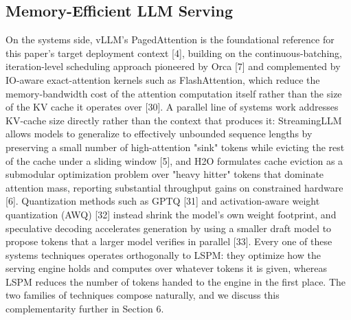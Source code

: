 \documentclass[pdflatex,sn-basic,Numbered]{sn-jnl}
\begin{document}
\subsection{Memory-Efficient LLM Serving}
On the systems side, vLLM's PagedAttention is the foundational reference for this paper's target deployment context [4], building on the continuous-batching, iteration-level scheduling approach pioneered by Orca [7] and complemented by IO-aware exact-attention kernels such as FlashAttention, which reduce the memory-bandwidth cost of the attention computation itself rather than the size of the KV cache it operates over [30]. A parallel line of systems work addresses KV-cache size directly rather than the context that produces it: StreamingLLM allows models to generalize to effectively unbounded sequence lengths by preserving a small number of high-attention "sink" tokens while evicting the rest of the cache under a sliding window [5], and H2O formulates cache eviction as a submodular optimization problem over "heavy hitter" tokens that dominate attention mass, reporting substantial throughput gains on constrained hardware [6]. Quantization methods such as GPTQ [31] and activation-aware weight quantization (AWQ) [32] instead shrink the model's own weight footprint, and speculative decoding accelerates generation by using a smaller draft model to propose tokens that a larger model verifies in parallel [33]. Every one of these systems techniques operates orthogonally to LSPM: they optimize how the serving engine holds and computes over whatever tokens it is given, whereas LSPM reduces the number of tokens handed to the engine in the first place. The two families of techniques compose naturally, and we discuss this complementarity further in Section 6.
\end{document}
